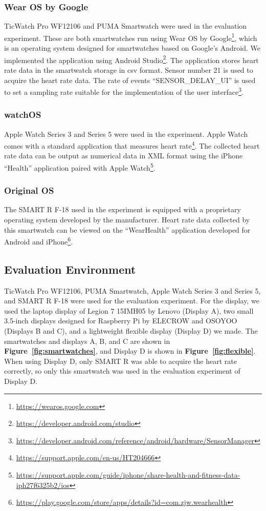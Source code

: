 \documentclass[sigconf]{acmart}
\newcommand\figref[1]{\textbf{Figure~\ref{fig:#1}}}
\begin{document}
\subsubsection{Wear OS by Google}
TicWatch Pro WF12106 and PUMA Smartwatch were used in the evaluation experiment. These are both smartwatches run using Wear OS by Google\footnote{\url{https://wearos.google.com}}, which is an operating system designed for smartwatches based on Google's Android. We implemented the application using Android Studio\footnote{\url{https://developer.android.com/studio}}. The application stores heart rate data in the smartwatch storage in csv format. Sensor number 21 is used to acquire the heart rate data. The rate of events ``SENSOR\_DELAY\_UI'' is used to set a sampling rate suitable for the implementation of the user interface\footnote{\url{https://developer.android.com/reference/android/hardware/SensorManager}}.


\subsubsection{watchOS}
\label{subsec:applewatch}
Apple Watch Series 3 and Series 5 were used in the experiment. Apple Watch comes with a standard application that measures heart rate\footnote{\url{https://support.apple.com/en-us/HT204666}}. The collected heart rate data can be output as numerical data in XML format using the iPhone ``Health'' application paired with Apple Watch\footnote{\url{https://support.apple.com/guide/iphone/share-health-and-fitness-data-iph27f6325b2/ios}}.


\subsubsection{Original OS}
\label{subsec:original}
The SMART R F-18 used in the experiment is equipped with a proprietary operating system developed by the manufacturer. Heart rate data collected by this smartwatch can be viewed on the ``WearHealth'' application developed for Android and iPhone\footnote{\url{https://play.google.com/store/apps/details?id=com.zjw.wearhealth}}.


\subsection{Evaluation Environment}
TicWatch Pro WF12106, PUMA Smartwatch, Apple Watch Series 3 and Series 5, and SMART R F-18 were used for the evaluation experiment. For the display, we used the laptop display of Legion 7 15IMH05 by Lenovo (Display A), two small 3.5-inch displays designed for Raspberry Pi by ELECROW and OSOYOO (Displays B and C), and a lightweight flexible display \cite{flexible_display} (Display D) we made. The smartwatches and displays A, B, and C are shown in \figref{smartwatches}, and Display D is shown in \figref{flexible}. When using Display D, only SMART R was able to acquire the heart rate correctly, so only this smartwatch was used in the evaluation experiment of Display D.
\end{document}
